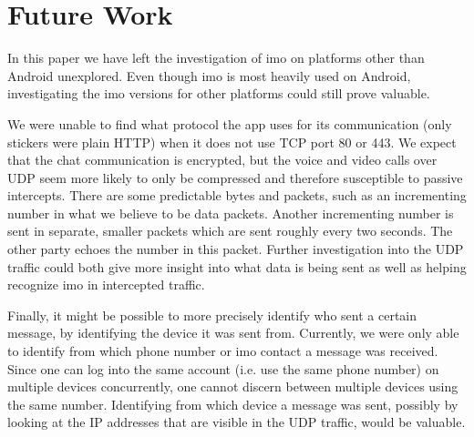 \documentclass[conference]{IEEEtran}
\begin{document}
\section{Future Work}\label{sec:futwork}

In this paper we have left the investigation of imo on platforms other than
Android unexplored. Even though imo is most heavily used on Android,
investigating the imo versions for other platforms could still prove valuable.

We were unable to find what protocol the app uses for its communication (only
stickers were plain HTTP) when it does not use TCP port 80 or 443. We expect
that the chat communication is encrypted, but the voice and video calls over
UDP seem more likely to only be compressed and therefore susceptible to passive
intercepts. There are some predictable bytes and packets, such as an
incrementing number in what we believe to be data packets. Another incrementing
number is sent in separate, smaller packets which are sent roughly every two
seconds. The other party echoes the number in this packet. Further
investigation into the UDP traffic could both give more insight into what data
is being sent as well as helping recognize imo in intercepted traffic.

Finally, it might be possible to more precisely identify who sent a certain
message, by identifying the device it was sent from. Currently, we were only
able to identify from which phone number or imo contact a message was received.
Since one can log into the same account (i.e. use the same phone number) on
multiple devices concurrently, one cannot discern between multiple devices
using the same number. Identifying from which device a message was sent,
possibly by looking at the IP addresses that are visible in the UDP traffic,
would be valuable.


\printbibliography
\end{document}

